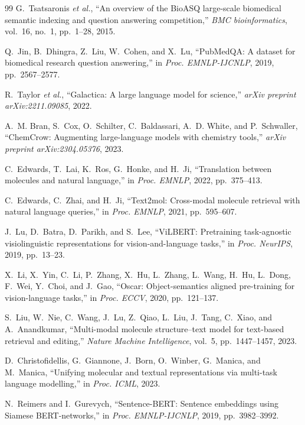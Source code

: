 \documentclass[conference]{IEEEtran}
\begin{document}
\begin{thebibliography}{99}
G.~Tsatsaronis \textit{et al.}, ``An overview of the BioASQ large-scale biomedical semantic indexing and question answering competition,'' \textit{BMC bioinformatics}, vol.~16, no.~1, pp.~1--28, 2015.

Q.~Jin, B.~Dhingra, Z.~Liu, W.~Cohen, and X.~Lu, ``PubMedQA: A dataset for biomedical research question answering,'' in \textit{Proc. EMNLP-IJCNLP}, 2019, pp.~2567--2577.

R.~Taylor \textit{et al.}, ``Galactica: A large language model for science,'' \textit{arXiv preprint arXiv:2211.09085}, 2022.

A.~M. Bran, S.~Cox, O.~Schilter, C.~Baldassari, A.~D. White, and P.~Schwaller, ``ChemCrow: Augmenting large-language models with chemistry tools,'' \textit{arXiv preprint arXiv:2304.05376}, 2023.

C.~Edwards, T.~Lai, K.~Ros, G.~Honke, and H.~Ji, ``Translation between molecules and natural language,'' in \textit{Proc. EMNLP}, 2022, pp.~375--413.

C.~Edwards, C.~Zhai, and H.~Ji, ``Text2mol: Cross-modal molecule retrieval with natural language queries,'' in \textit{Proc. EMNLP}, 2021, pp.~595--607.

J.~Lu, D.~Batra, D.~Parikh, and S.~Lee, ``ViLBERT: Pretraining task-agnostic visiolinguistic representations for vision-and-language tasks,'' in \textit{Proc. NeurIPS}, 2019, pp.~13--23.

X.~Li, X.~Yin, C.~Li, P.~Zhang, X.~Hu, L.~Zhang, L.~Wang, H.~Hu, L.~Dong, F.~Wei, Y.~Choi, and J.~Gao, ``Oscar: Object-semantics aligned pre-training for vision-language tasks,'' in \textit{Proc. ECCV}, 2020, pp.~121--137.

S.~Liu, W.~Nie, C.~Wang, J.~Lu, Z.~Qiao, L.~Liu, J.~Tang, C.~Xiao, and A.~Anandkumar, ``Multi-modal molecule structure--text model for text-based retrieval and editing,'' \textit{Nature Machine Intelligence}, vol.~5, pp.~1447--1457, 2023.

D.~Christofidellis, G.~Giannone, J.~Born, O.~Winber, G.~Manica, and M.~Manica, ``Unifying molecular and textual representations via multi-task language modelling,'' in \textit{Proc. ICML}, 2023.

N.~Reimers and I.~Gurevych, ``Sentence-BERT: Sentence embeddings using Siamese BERT-networks,'' in \textit{Proc. EMNLP-IJCNLP}, 2019, pp.~3982--3992.


\end{thebibliography}
\end{document}
